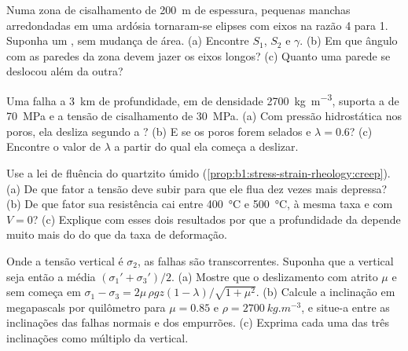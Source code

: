 \begin{exercise}[$\star\star$]\label{exo:b1:stress-strain-rheology:7}
Numa zona de cisalhamento de \qty{200}{m} de espessura, pequenas manchas arredondadas em uma ardósia tornaram-se elipses com eixos na razão 4 para 1. Suponha um , sem mudança de área. (a) Encontre $S_1$, $S_2$ e $\gamma$. (b) Em que ângulo com as paredes da zona devem jazer os eixos longos? (c) Quanto uma parede se deslocou além da outra?
\end{exercise}

\begin{exercise}[$\star\star$]\label{exo:b1:stress-strain-rheology:8}
Uma falha a \qty{3}{km} de profundidade, em  de densidade \qty{2700}{kg.m^{-3}}, suporta a  de \qty{70}{MPa} e a tensão de cisalhamento de \qty{30}{MPa}. (a) Com pressão hidrostática nos poros, ela desliza segundo a ? (b) E se os poros forem selados e $\lambda = 0.6$? (c) Encontre o valor de $\lambda$ a partir do qual ela começa a deslizar.
\end{exercise}

\begin{exercise}[$\star\star$]\label{exo:b1:stress-strain-rheology:9}
Use a lei de fluência do quartzito úmido (\cref{prop:b1:stress-strain-rheology:creep}). (a) De que fator a tensão deve subir para que ele flua dez vezes mais depressa? (b) De que fator sua resistência cai entre \qty{400}{\degreeCelsius}
e \qty{500}{\degreeCelsius}, à mesma taxa e com $V = 0$? (c) Explique com esses dois resultados por que a profundidade da 
depende muito mais do  do que da taxa de deformação.
\end{exercise}

\begin{exercise}[$\star\star\star$]\label{exo:b1:stress-strain-rheology:10}
Onde a tensão vertical é $\sigma_2$, as falhas são transcorrentes. Suponha que a  vertical seja então a média $(\sigma_1' + \sigma_3')/2$.
(a) Mostre que o deslizamento com atrito $\mu$ e sem  começa em $\sigma_1 - \sigma_3 = 2\mu\,\rho g z(1-\lambda)/\sqrt{1+\mu^2}$. (b) Calcule a inclinação em megapascals por quilômetro para $\mu = 0.85$ e $\rho = \qty{2700}{kg.m^{-3}}$, e situe-a entre as inclinações das falhas normais e dos empurrões. (c) Exprima cada uma das três inclinações como múltiplo da  vertical.
\end{exercise}


